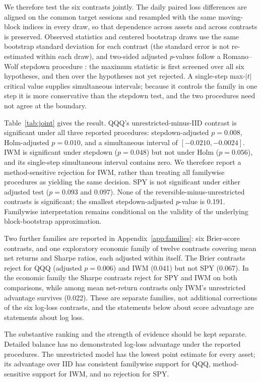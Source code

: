 We therefore test the six contrasts jointly. The daily paired loss differences are aligned on the common target sessions and resampled with the same moving-block indices in every draw, so that dependence across assets and across contrasts is preserved. Observed statistics and centered bootstrap draws use the same bootstrap standard deviation for each contrast (the standard error is not re-estimated within each draw), and two-sided adjusted $p$-values follow a Romano--Wolf stepdown procedure \citep{RomanoWolf2005}: the maximum statistic is first screened over all six hypotheses, and then over the hypotheses not yet rejected. A single-step max-$|t|$ critical value supplies simultaneous intervals; because it controls the family in one step it is more conservative than the stepdown test, and the two procedures need not agree at the boundary.

Table~\ref{tab:joint} gives the result. QQQ's unrestricted-minus-IID contrast is significant under all three reported procedures: stepdown-adjusted $p=0.008$, Holm-adjusted $p=0.010$, and a simultaneous interval of $[-0.0210,-0.0024]$. IWM is significant under stepdown ($p=0.048$) but not under Holm ($p=0.056$), and its single-step simultaneous interval contains zero. We therefore report a method-sensitive rejection for IWM, rather than treating all familywise procedures as yielding the same decision. SPY is not significant under either adjusted test ($p=0.093$ and $0.097$). None of the reversible-minus-unrestricted contrasts is significant; the smallest stepdown-adjusted $p$-value is 0.191. Familywise interpretation remains conditional on the validity of the underlying block-bootstrap approximation.

Two further families are reported in Appendix~\ref{app:families}: six Brier-score contrasts, and one exploratory economic family of twelve contrasts covering mean net returns and Sharpe ratios, each adjusted within itself. The Brier contrasts reject for QQQ (adjusted $p=0.006$) and IWM (0.041) but not SPY (0.067). In the economic family the Sharpe contrasts reject for SPY and IWM on both comparisons, while among mean net-return contrasts only IWM's unrestricted advantage survives (0.022). These are separate families, not additional corrections of the six log-loss contrasts, and the statements below about score advantage are statements about log loss.

The substantive ranking and the strength of evidence should be kept separate. Detailed balance has no demonstrated log-loss advantage under the reported procedures. The unrestricted model has the lowest point estimate for every asset; its advantage over IID has consistent familywise support for QQQ, method-sensitive support for IWM, and no rejection for SPY.

